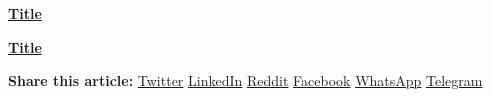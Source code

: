 \documentclass[12pt]{article}
\begin{document}
\vspace{2em}
\noindent
\begin{minipage}{0.48\textwidth}
    \raggedright
    \textbf{\href{https://example.com/post}{\textlangle\quad Title}}
\end{minipage}
\hfill
\begin{minipage}{0.48\textwidth}
    \raggedleft
    \textbf{\href{https://example.com/post}{Title \quad\textrangle}}
\end{minipage}
\vspace{2em}

\begin{center}
  \vspace{1em}
  \textbf{Share this article:}
  \href{https://example.com/post}{Twitter} \textbar{}
  \href{https://example.com/post}{LinkedIn} \textbar{}
  \href{https://example.com/post}{Reddit} \textbar{}
  \href{https://example.com/post}{Facebook} \textbar{}
  \href{https://example.com/post}{WhatsApp} \textbar{}
  \href{https://example.com/post}{Telegram}
\end{center}
\end{document}
